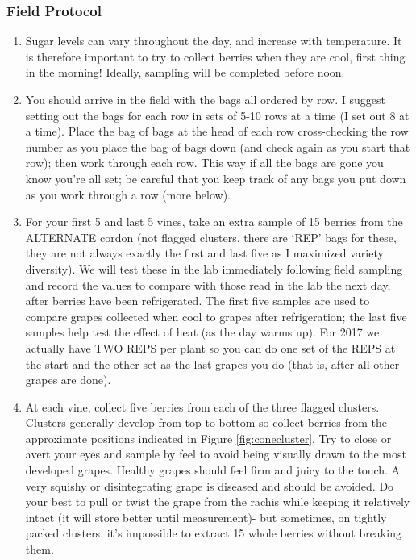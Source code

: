 \documentclass[11pt,letter]{article}
\begin{document}
\subsubsection{Field Protocol}
\begin{enumerate}
\item Sugar levels can vary throughout the day, and increase with temperature. It is therefore important to try to collect berries when they are cool, first thing in the morning! Ideally, sampling will be completed before noon. 

\item You should arrive in the field with the bags all ordered by row.  I suggest setting out the bags for each row in sets of 5-10 rows at a time (I set out 8 at a time). Place the bag of bags at the head of each row cross-checking the row number as you place the bag of bags down (and check again as you start that row); then work through each row. This way if all the bags are gone you know you're all set; be careful that you keep track of any bags you put down as you work through a row (more below).

\item For your first 5 and last 5 vines, take an extra sample of 15 berries from the ALTERNATE cordon (not flagged clusters, there are ‘REP’ bags for these, they are not always exactly the first and last five as I maximized variety diversity). We will test these in the lab immediately following field sampling and record the values to compare with those read in the lab the next day, after berries have been refrigerated. The first five samples are used to compare grapes collected when cool to grapes after refrigeration; the last five samples help test the effect of heat (as the day warms up). For 2017 we actually have TWO REPS per plant so you can do one set of the REPS at the start and the other set as the last grapes you do (that is, after all other grapes are done).

\item At each vine, collect five berries from each of the three flagged clusters. Clusters generally develop from top to bottom so collect berries from the approximate positions indicated in Figure \ref{fig:conecluster}. Try to close or avert your eyes and sample by feel to avoid being visually drawn to the most developed grapes. Healthy grapes should feel firm and juicy to the touch. A very squishy or disintegrating grape is diseased and should be avoided. Do your best to pull or twist the grape from the rachis while keeping it relatively intact (it will store better until measurement)- but sometimes, on tightly packed clusters, it’s impossible to extract 15 whole berries without breaking them. 


\end{enumerate}
\end{document}
